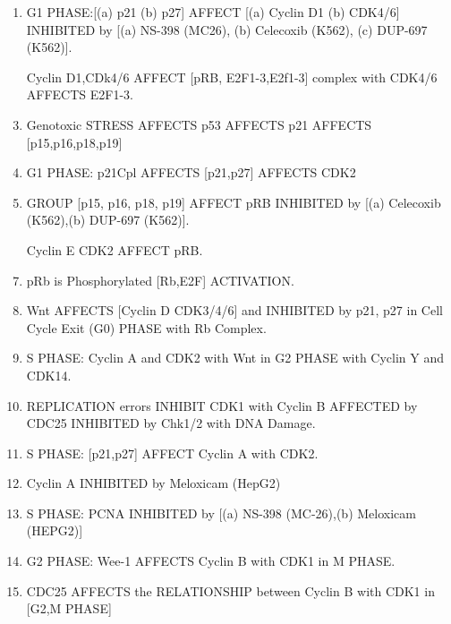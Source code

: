 
\begin{enumerate}
	\item G1 PHASE:[(a) p21 (b) p27] AFFECT [(a) Cyclin D1 (b) CDK4/6] INHIBITED by [(a) NS-398 (MC26), (b) Celecoxib (K562), (c) DUP-697 (K562)]. \cite{key4000}
	\item [Cyclin D1,CDk4/6] AFFECT [pRB, E2F1-3,E2f1-3] complex with CDK4/6 AFFECTS E2F1-3. \cite{key4000}
	\item Genotoxic STRESS AFFECTS p53 AFFECTS p21 AFFECTS [p15,p16,p18,p19] \cite{key4000}
	\item G1 PHASE: p21Cpl AFFECTS [p21,p27] AFFECTS CDK2 \cite{key4000}
	\item GROUP [p15, p16, p18, p19] AFFECT pRB INHIBITED by [(a) Celecoxib (K562),(b) DUP-697 (K562)]. \cite{key4000} 
	\item [Cyclin E CDK2] AFFECT pRB.  \cite{key4000}
	\item pRb is Phosphorylated [Rb,E2F] ACTIVATION. \cite{key4000}
	\item Wnt AFFECTS [Cyclin D CDK3/4/6] and INHIBITED by p21, p27 in Cell Cycle Exit (G0) PHASE with Rb Complex. \cite{key4000}
	\item S PHASE: Cyclin A and CDK2 with Wnt in G2 PHASE with Cyclin Y and CDK14.  \cite{key4000}
	\item REPLICATION errors INHIBIT CDK1 with Cyclin B AFFECTED by CDC25 INHIBITED by Chk1/2 with DNA Damage. \cite{key4000}
	\item S PHASE: [p21,p27] AFFECT Cyclin A with CDK2. \cite{key4000}
	\item Cyclin A INHIBITED by Meloxicam (HepG2) \cite{key4000}
	\item S PHASE: PCNA INHIBITED by [(a) NS-398 (MC-26),(b) Meloxicam (HEPG2)] \cite{key4000}
	\item G2 PHASE: Wee-1 AFFECTS Cyclin B with CDK1 in M PHASE.  \cite{key4000}
	\item CDC25 AFFECTS the RELATIONSHIP between Cyclin B with CDK1 in [G2,M PHASE] \cite{key4000}	
\end{enumerate}


